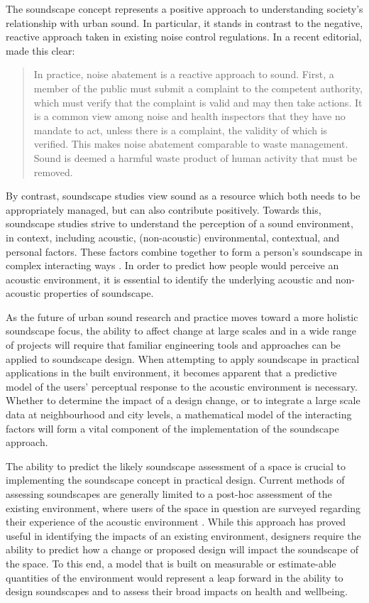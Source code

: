 The soundscape concept represents a positive approach to understanding society's relationship with urban sound. In particular, it stands in contrast to the negative, reactive approach taken in existing noise control regulations. In a recent editorial, \citet{Axelsson2020Soundscape} made this clear:

\begin{quote}
  In practice, noise abatement is a reactive approach to sound. First, a member of the public must submit a complaint to the competent authority, which must verify that the complaint is valid and may then take actions. It is a common view among noise and health inspectors that they have no mandate to act, unless there is a complaint, the validity of which is verified. This makes noise abatement comparable to waste management. Sound is deemed a harmful waste product of human activity that must be removed.
\end{quote}

By contrast, soundscape studies view sound as a resource which both needs to be appropriately managed, but can also contribute positively. Towards this, soundscape studies strive to understand the perception of a sound environment, in context, including acoustic, (non-acoustic) environmental, contextual, and personal factors. These factors combine together to form a person's soundscape in complex interacting ways \citep{Berglund2006Tool}. In order to predict how people would perceive an acoustic environment, it is essential to identify the underlying acoustic and non-acoustic properties of soundscape.

As the future of urban sound research and practice moves toward a more holistic soundscape focus, the ability to affect change at large scales and in a wide range of projects will require that familiar engineering tools and approaches can be applied to soundscape design. When attempting to apply soundscape in practical applications in the built environment, it becomes apparent that a predictive model of the users' perceptual response to the acoustic environment is necessary. Whether to determine the impact of a design change, or to integrate a large scale data at neighbourhood and city levels, a mathematical model of the interacting factors will form a vital component of the implementation of the soundscape approach. 

The ability to predict the likely soundscape assessment of a space is crucial to implementing the soundscape concept in practical design. Current methods of assessing soundscapes are generally limited to a post-hoc assessment of the existing environment, where users of the space in question are surveyed regarding their experience of the acoustic environment \citep{Engel2018Review, Zhang2018Effect}. While this approach has proved useful in identifying the impacts of an existing environment, designers require the ability to predict how a change or proposed design will impact the soundscape of the space. To this end, a model that is built on measurable or estimate-able quantities of the environment would represent a leap forward in the ability to design soundscapes and to assess their broad impacts on health and wellbeing.

